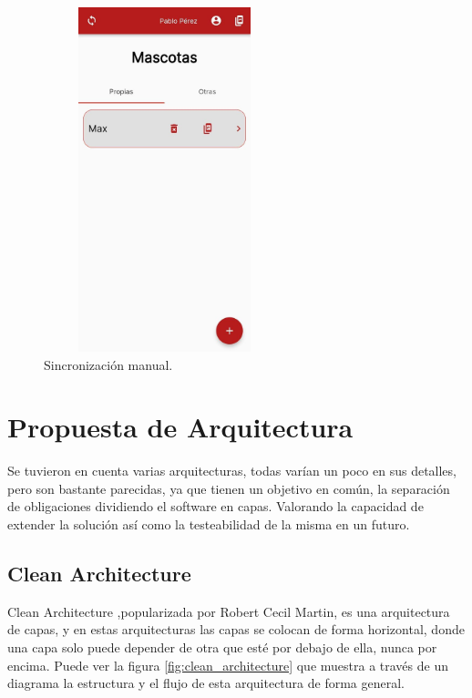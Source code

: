 \begin{figure}[H]
	\centering
	\includegraphics[width=7cm, height=10cm]{Graphics/pets_view.jpg}
	\caption{Sincronización manual.}
	\label{fig:pets_view}
\end{figure}

  \section{Propuesta de Arquitectura}
  
  Se tuvieron en cuenta varias arquitecturas, todas varían un poco en sus detalles, pero son bastante parecidas, ya que tienen un objetivo en común, la separación de obligaciones dividiendo el software en capas. Valorando la capacidad de extender la solución así como la testeabilidad de la misma en un futuro.
  
  \subsection{Clean Architecture}
  Clean Architecture ,popularizada por Robert Cecil Martin, es una arquitectura de capas, y
  en estas arquitecturas las capas se colocan de forma horizontal, donde una capa solo puede depender
  de otra que esté por debajo de ella, nunca por encima. Puede ver la figura \ref{fig:clean_architecture} que muestra a través
  de un diagrama la estructura y el flujo de esta arquitectura de forma general.
  

